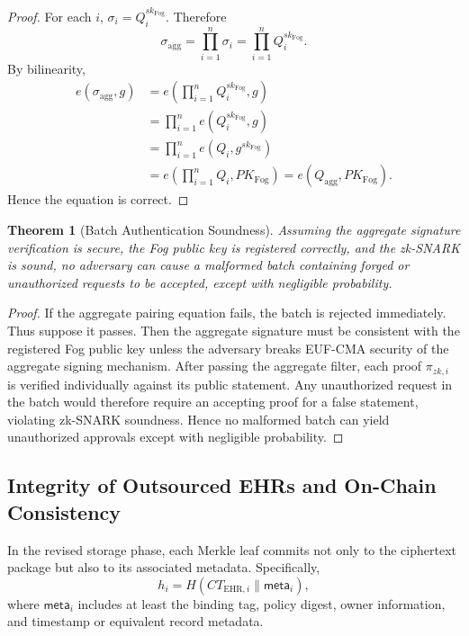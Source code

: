 \documentclass[conference]{IEEEtran}
\newtheorem{theorem}{Theorem}
\begin{document}
\begin{proof}
For each $i$, $\sigma_i=Q_i^{sk_{\mathrm{Fog}}}$. Therefore
\[
\sigma_{\mathrm{agg}}
=\prod_{i=1}^{n}\sigma_i
=\prod_{i=1}^{n}Q_i^{sk_{\mathrm{Fog}}}.
\]
By bilinearity,
\begin{align*}
e(\sigma_{\mathrm{agg}},g)
&= e\!\left(\prod_{i=1}^{n}Q_i^{sk_{\mathrm{Fog}}},g\right) \\
&= \prod_{i=1}^{n}e(Q_i^{sk_{\mathrm{Fog}}},g) \\
&= \prod_{i=1}^{n}e(Q_i,g^{sk_{\mathrm{Fog}}}) \\
&= e\!\left(\prod_{i=1}^{n}Q_i,PK_{\mathrm{Fog}}\right)
= e(Q_{\mathrm{agg}},PK_{\mathrm{Fog}}).
\end{align*}
Hence the equation is correct.
\end{proof}

\begin{theorem}[Batch Authentication Soundness]
Assuming the aggregate signature verification is secure, the Fog public key is registered correctly, and the zk-SNARK is sound, no adversary can cause a malformed batch containing forged or unauthorized requests to be accepted, except with negligible probability.
\end{theorem}

\begin{proof}
If the aggregate pairing equation fails, the batch is rejected immediately. Thus suppose it passes. Then the aggregate signature must be consistent with the registered Fog public key unless the adversary breaks EUF-CMA security of the aggregate signing mechanism. After passing the aggregate filter, each proof $\pi_{zk,i}$ is verified individually against its public statement. Any unauthorized request in the batch would therefore require an accepting proof for a false statement, violating zk-SNARK soundness. Hence no malformed batch can yield unauthorized approvals except with negligible probability.
\end{proof}

\subsection{Integrity of Outsourced EHRs and On-Chain Consistency}

In the revised storage phase, each Merkle leaf commits not only to the ciphertext package but also to its associated metadata. Specifically,
\[
h_i = H(CT_{\mathrm{EHR},i}\|\mathsf{meta}_i),
\]
where $\mathsf{meta}_i$ includes at least the binding tag, policy digest, owner information, and timestamp or equivalent record metadata.
\end{document}
